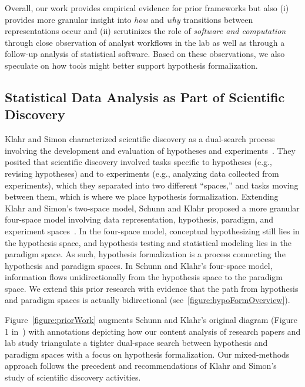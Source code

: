 Overall, our work provides empirical evidence for prior frameworks but also (i)
provides more granular insight into \textit{how} and \textit{why} transitions between
representations occur and (ii) scrutinizes the role of
\textit{software and computation} through close observation of analyst workflows
in the lab as well as through a follow-up analysis of statistical software. Based on
these observations, we also speculate on how tools might better support hypothesis
formalization.

\subsection{Statistical Data Analysis as Part of Scientific Discovery}
Klahr and Simon characterized scientific discovery as a dual-search process
involving the development and evaluation of hypotheses and
experiments~\cite{klahr1988dual}. They posited that scientific discovery
involved tasks specific to hypotheses (e.g., revising hypotheses) and to
experiments (e.g., analyzing data collected from experiments), which they
separated into two different ``spaces,'' and tasks moving between them, which is
where we place hypothesis formalization. Extending Klahr and Simon's two-space
model, Schunn and Klahr proposed a more granular four-space model involving data
representation, hypothesis, paradigm, and experiment
spaces~\cite{schunn1995FourSpace,schunn1996BeyondTwoSpace}. In the four-space
model, conceptual hypothesizing still lies in the hypothesis space, and
hypothesis testing and statistical modeling lies in the paradigm space. As such,
hypothesis formalization is a process connecting the hypothesis and paradigm
spaces. In Schunn and Klahr's four-space model, information flows
unidirectionally from the hypothesis space to the paradigm space. We extend this
prior research with evidence that the path from hypothesis and paradigm spaces
is actually bidirectional (see~\autoref{figure:hypoFormOverview}).

Figure~\ref{figure:priorWork} augments Schunn and Klahr's
original diagram (Figure 1 in~\cite{schunn1995FourSpace}) with
annotations depicting how our content analysis of research papers and lab study
triangulate a tighter dual-space search between hypothesis and
paradigm spaces with a focus on hypothesis formalization. Our mixed-methods
approach follows the precedent and recommendations of Klahr and
Simon's~\cite{klahr1999studies} study of scientific discovery activities.


